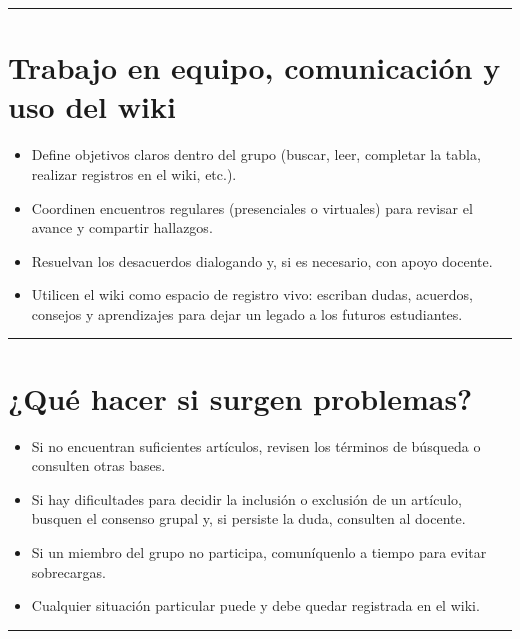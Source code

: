 \documentclass[
  letterpaper,
]{book}
\providecommand{\tightlist}{%
  \setlength{\itemsep}{0pt}\setlength{\parskip}{0pt}}\usepackage{longtable,booktabs,array}
\begin{document}
\begin{center}\rule{0.5\linewidth}{0.5pt}\end{center}

\section{Trabajo en equipo, comunicación y uso del
wiki}\label{trabajo-en-equipo-comunicaciuxf3n-y-uso-del-wiki}

\begin{itemize}
\tightlist
\item
  Define objetivos claros dentro del grupo (buscar, leer, completar la
  tabla, realizar registros en el wiki, etc.).
\item
  Coordinen encuentros regulares (presenciales o virtuales) para revisar
  el avance y compartir hallazgos.
\item
  Resuelvan los desacuerdos dialogando y, si es necesario, con apoyo
  docente.
\item
  Utilicen el wiki como espacio de registro vivo: escriban dudas,
  acuerdos, consejos y aprendizajes para dejar un legado a los futuros
  estudiantes.
\end{itemize}

\begin{center}\rule{0.5\linewidth}{0.5pt}\end{center}

\section{¿Qué hacer si surgen
problemas?}\label{quuxe9-hacer-si-surgen-problemas}

\begin{itemize}
\tightlist
\item
  Si no encuentran suficientes artículos, revisen los términos de
  búsqueda o consulten otras bases.
\item
  Si hay dificultades para decidir la inclusión o exclusión de un
  artículo, busquen el consenso grupal y, si persiste la duda, consulten
  al docente.
\item
  Si un miembro del grupo no participa, comuníquenlo a tiempo para
  evitar sobrecargas.
\item
  Cualquier situación particular puede y debe quedar registrada en el
  wiki.
\end{itemize}

\begin{center}\rule{0.5\linewidth}{0.5pt}\end{center}
\end{document}
